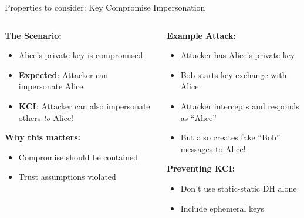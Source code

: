 \documentclass[aspectratio=169, lualatex, handout]{beamer}
\begin{document}
\begin{frame}{Properties to consider: Key Compromise Impersonation}
	\begin{columns}
		\begin{column}{0.5\textwidth}
			\textbf{The Scenario:}
			\begin{itemize}
				\item Alice's private key is compromised
				\item \textbf{Expected}: Attacker can impersonate Alice
				\item \textbf{KCI}: Attacker can also impersonate others \textit{to} Alice!
			\end{itemize}
			\textbf{Why this matters:}
			\begin{itemize}
				\item Compromise should be contained
				\item Trust assumptions violated
			\end{itemize}
		\end{column}
		\begin{column}{0.5\textwidth}
			\textbf{Example Attack:}
			\begin{itemize}
				\item Attacker has Alice's private key
				\item Bob starts key exchange with Alice
				\item Attacker intercepts and responds as ``Alice''
				\item But also creates fake ``Bob'' messages to Alice!
			\end{itemize}
			\textbf{Preventing KCI:}
			\begin{itemize}
				\item Don't use static-static DH alone
				\item Include ephemeral keys
			\end{itemize}
		\end{column}
	\end{columns}
\end{frame}
\end{document}
